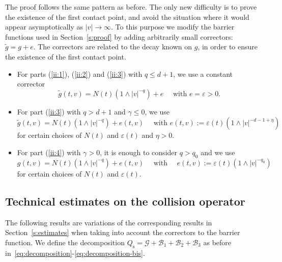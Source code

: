 \documentclass[11pt]{article}
\newcommand{\rs}{\mathrm{s}}
\theoremstyle{plain}
\theoremstyle{definition}
\numberwithin{equation}{section}
\newcommand{\eps}{\varepsilon}
\let\A N
\begin{document}
The proof follows the same pattern as before. The only new difficulty
is to prove the existence of the first contact point, and avoid the
situation where it would appear asymptotically as $|v| \to \infty$. To
this purpose we modify the barrier functions used in
Section~\ref{s:proof} by adding arbitrarily small correctors:
$\tilde g = g + e$. The correctors are related to the decay known on
$g$, in order to ensure the existence of the first contact point.

\begin{itemize}
\item For parts (\ref{ii:1}), (\ref{ii:2}) and (\ref{ii:3}) with
$q \leq d+1$, we use a constant corrector
\begin{equation}
\label{e:g1}
\tilde g(t,v) = \A(t) \left(1 \wedge |v|^{-q}\right) + e \quad
\mbox{ with } e = \eps >0.
\end{equation}

\item For part (\ref{ii:3}) with $q>d+1$ and $\gamma \leq 0$, we use
\begin{equation} \label{e:g2} \tilde g(t,v) = \A(t) \left(1 \wedge
|v|^{-q} \right) + e(t,v) \quad \mbox{ with } e(t,v):=\eps(t) \left(1 \wedge
|v|^{-d-1+\eta}\right)
\end{equation}
for certain choices of $\A(t)$ and $\eps(t)$ and $\eta>0$.

\item For part (\ref{ii:4}) with $\gamma > 0$, it is enough to
consider $q > q_0$ and we use
\begin{equation} \label{e:g3} g(t,v) = \A(t) \left(1 \wedge |v|^{-q}\right) +
e(t,v) \quad \mbox{ with } \quad e(t,v) := \eps(t) \left(1 \wedge
|v|^{-q_0}\right)
\end{equation}
for certain choices of $\A(t)$ and $\eps(t)$.
\end{itemize}

\subsection{Technical estimates on the collision operator}

The following results are variations of the corresponding results in
Section~\ref{s:estimates} when taking into account the correctors to
the barrier function. We define the decomposition
$Q_{\rs} = \mathcal{G} + \mathcal{B}_1 + \mathcal{B}_2 + \mathcal{B}_3$ as
before in~\eqref{eq:decomposition}-\eqref{eq:decomposition-bis}.
\end{document}
